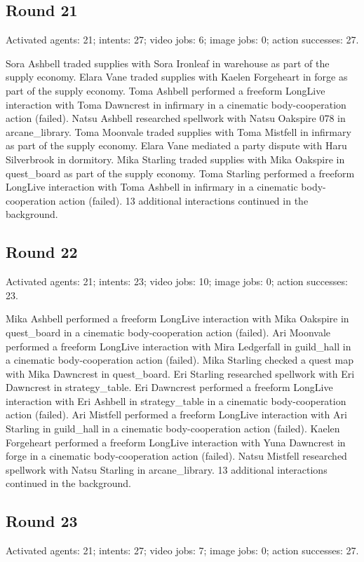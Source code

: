 \documentclass[11pt,a4paper]{article}
\begin{document}
\subsection{Round 21}
Activated agents: 21; intents: 27; video jobs: 6; image jobs: 0; action successes: 27.

Sora Ashbell traded supplies with Sora Ironleaf in warehouse as part of the supply economy. Elara Vane traded supplies with Kaelen Forgeheart in forge as part of the supply economy. Toma Ashbell performed a freeform LongLive interaction with Toma Dawncrest in infirmary in a cinematic body-cooperation action (failed). Natsu Ashbell researched spellwork with Natsu Oakspire 078 in arcane\_library. Toma Moonvale traded supplies with Toma Mistfell in infirmary as part of the supply economy. Elara Vane mediated a party dispute with Haru Silverbrook in dormitory. Mika Starling traded supplies with Mika Oakspire in quest\_board as part of the supply economy. Toma Starling performed a freeform LongLive interaction with Toma Ashbell in infirmary in a cinematic body-cooperation action (failed). 13 additional interactions continued in the background.

\subsection{Round 22}
Activated agents: 21; intents: 23; video jobs: 10; image jobs: 0; action successes: 23.

Mika Ashbell performed a freeform LongLive interaction with Mika Oakspire in quest\_board in a cinematic body-cooperation action (failed). Ari Moonvale performed a freeform LongLive interaction with Mira Ledgerfall in guild\_hall in a cinematic body-cooperation action (failed). Mika Starling checked a quest map with Mika Dawncrest in quest\_board. Eri Starling researched spellwork with Eri Dawncrest in strategy\_table. Eri Dawncrest performed a freeform LongLive interaction with Eri Ashbell in strategy\_table in a cinematic body-cooperation action (failed). Ari Mistfell performed a freeform LongLive interaction with Ari Starling in guild\_hall in a cinematic body-cooperation action (failed). Kaelen Forgeheart performed a freeform LongLive interaction with Yuna Dawncrest in forge in a cinematic body-cooperation action (failed). Natsu Mistfell researched spellwork with Natsu Starling in arcane\_library. 13 additional interactions continued in the background.

\subsection{Round 23}
Activated agents: 21; intents: 27; video jobs: 7; image jobs: 0; action successes: 27.
\end{document}
